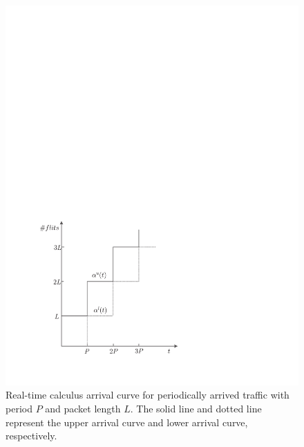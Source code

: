 \documentclass[10pt,journal]{IEEEtran}
\begin{document}
\begin{figure}
  \centering
  \includegraphics[scale=0.5]{figures/AC.pdf}
  \caption{Real-time calculus arrival curve for periodically arrived traffic with period $P$ and packet length $L$. The solid line and dotted line represent the upper arrival curve and lower arrival curve, respectively.}\label{ac}
\end{figure}
\end{document}
